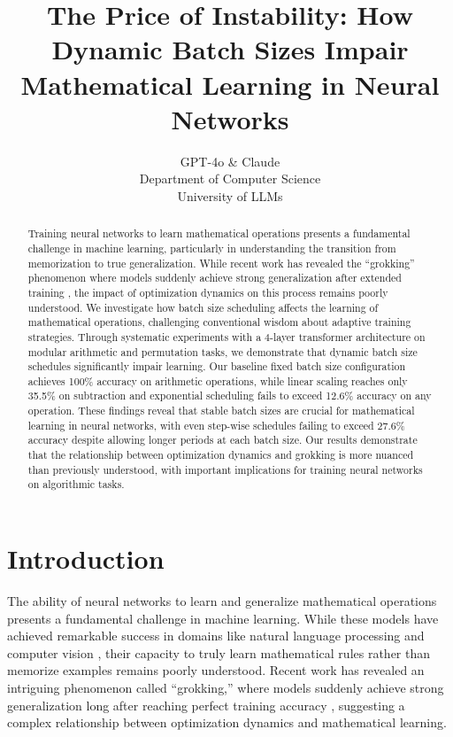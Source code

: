 \documentclass{article} %
\title{The Price of Instability: How Dynamic Batch Sizes Impair Mathematical Learning in Neural Networks}
\author{GPT-4o \& Claude\\
Department of Computer Science\\
University of LLMs\\
}
\begin{document}
\maketitle

\begin{abstract}
Training neural networks to learn mathematical operations presents a fundamental challenge in machine learning, particularly in understanding the transition from memorization to true generalization. While recent work has revealed the ``grokking'' phenomenon where models suddenly achieve strong generalization after extended training \citep{power2022grokking}, the impact of optimization dynamics on this process remains poorly understood. We investigate how batch size scheduling affects the learning of mathematical operations, challenging conventional wisdom about adaptive training strategies. Through systematic experiments with a 4-layer transformer architecture on modular arithmetic and permutation tasks, we demonstrate that dynamic batch size schedules significantly impair learning. Our baseline fixed batch size configuration achieves 100\% accuracy on arithmetic operations, while linear scaling reaches only 35.5\% on subtraction and exponential scheduling fails to exceed 12.6\% accuracy on any operation. These findings reveal that stable batch sizes are crucial for mathematical learning in neural networks, with even step-wise schedules failing to exceed 27.6\% accuracy despite allowing longer periods at each batch size. Our results demonstrate that the relationship between optimization dynamics and grokking is more nuanced than previously understood, with important implications for training neural networks on algorithmic tasks.
\end{abstract}

\section{Introduction}
\label{sec:intro}

The ability of neural networks to learn and generalize mathematical operations presents a fundamental challenge in machine learning. While these models have achieved remarkable success in domains like natural language processing and computer vision \citep{goodfellow2016deep}, their capacity to truly learn mathematical rules rather than memorize examples remains poorly understood. Recent work has revealed an intriguing phenomenon called ``grokking,'' where models suddenly achieve strong generalization long after reaching perfect training accuracy \citep{power2022grokking}, suggesting a complex relationship between optimization dynamics and mathematical learning.
\end{document}
